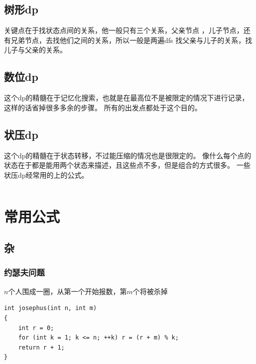 \documentclass[a4paper,13.6pt]{article}
\begin{document}
\begin{CJK}{UTF8}{gbsn}
\subsection{树形dp}
关键点在于找状态点间的关系，他一般只有三个关系，父亲节点
，儿子节点，还有兄弟节点，去找他们之间的关系，所以一般是两遍dfs
找父亲与儿子的关系，找儿子与父亲的关系。
\subsection{数位dp}
这个dp的精髓在于记忆化搜索，也就是在最高位不是被限定的情况下进行记录，这样的话省掉很多多余的步骤。
所有的出发点都处于这个目的。
\subsection{状压dp}
这个dp的精髓在于状态转移，不过能压缩的情况也是很限定的。
像什么每个点的状态在于都是能用两个状态来描述，且这些点不多，但是组合的方式很多。
一些状压dp经常用的上的公式。
\inputminted{c++}{../scoure/dp/zhuangtai.cpp}
\section{常用公式}
\subsection{杂}
\subsubsection{约瑟夫问题}
$n$个人围成一圈，从第一个开始报数，第$m$个将被杀掉
\begin{lstlisting}
int josephus(int n, int m)
{
    int r = 0;
    for (int k = 1; k <= n; ++k) r = (r + m) % k;
    return r + 1;
}
\end{lstlisting}

\end{CJK}
\end{document}
